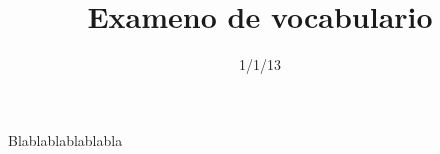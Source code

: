 \documentclass[addpoints,fr,biblatex]{isae-exam}
\title[Exameno de vocabulario, question \thequestion]{Exameno de vocabulario}
\date{1/1/13}
\begin{document}
\begin{coverpages}
  \basiccoverpage{}
\end{coverpages}

Blablablablablabla
\end{document}
